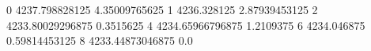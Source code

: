 0 4237.798828125 4.35009765625
1 4236.328125 2.87939453125
2 4233.80029296875 0.3515625
4 4234.65966796875 1.2109375
6 4234.046875 0.59814453125
8 4233.44873046875 0.0
